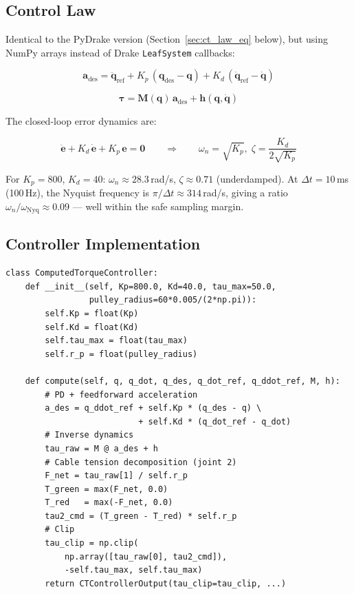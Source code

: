 \documentclass[11pt,a4paper]{article}
\newcommand{\bq}{\bm{q}}
\newcommand{\bdq}{\dot{\bm{q}}}
\newcommand{\bddq}{\ddot{\bm{q}}}
\newcommand{\btau}{\bm{\tau}}
\newcommand{\bM}{\bm{M}}
\newcommand{\bh}{\bm{h}}
\begin{document}
\subsection{Control Law}

Identical to the PyDrake version (Section~\ref{sec:ct_law_eq} below), but using NumPy arrays instead of Drake \texttt{LeafSystem} callbacks:

\begin{equation}
\boxed{
\bm{a}_{\mathrm{des}} = \bddq_{\mathrm{ref}} + K_p\,(\bq_{\mathrm{des}} - \bq) + K_d\,(\bdq_{\mathrm{ref}} - \bdq)
}
\label{sec:ct_law_eq}
\end{equation}

\begin{equation}
\boxed{
\btau = \bM(\bq)\,\bm{a}_{\mathrm{des}} + \bh(\bq, \bdq)
}
\label{eq:ct_isaac}
\end{equation}

The closed-loop error dynamics are:

\begin{equation}
    \ddot{\bm{e}} + K_d\,\dot{\bm{e}} + K_p\,\bm{e} = \bm{0}
    \qquad \Longrightarrow \qquad
    \omega_n = \sqrt{K_p},\; \zeta = \frac{K_d}{2\sqrt{K_p}}
\end{equation}

\begin{resultbox}
For $K_p = 800$, $K_d = 40$: $\omega_n \approx 28.3$\,rad/s, $\zeta \approx 0.71$ (underdamped). At $\Delta t = 10$\,ms (100\,Hz), the Nyquist frequency is $\pi/\Delta t \approx 314$\,rad/s, giving a ratio $\omega_n / \omega_{\mathrm{Nyq}} \approx 0.09$ --- well within the safe sampling margin.
\end{resultbox}

\subsection{Controller Implementation}

\begin{lstlisting}[caption={Engine-agnostic CT controller --- \texttt{controller/computed\_torque\_isaacsim.py}}]
class ComputedTorqueController:
    def __init__(self, Kp=800.0, Kd=40.0, tau_max=50.0,
                 pulley_radius=60*0.005/(2*np.pi)):
        self.Kp = float(Kp)
        self.Kd = float(Kd)
        self.tau_max = float(tau_max)
        self.r_p = float(pulley_radius)

    def compute(self, q, q_dot, q_des, q_dot_ref, q_ddot_ref, M, h):
        # PD + feedforward acceleration
        a_des = q_ddot_ref + self.Kp * (q_des - q) \
                           + self.Kd * (q_dot_ref - q_dot)
        # Inverse dynamics
        tau_raw = M @ a_des + h
        # Cable tension decomposition (joint 2)
        F_net = tau_raw[1] / self.r_p
        T_green = max(F_net, 0.0)
        T_red   = max(-F_net, 0.0)
        tau2_cmd = (T_green - T_red) * self.r_p
        # Clip
        tau_clip = np.clip(
            np.array([tau_raw[0], tau2_cmd]),
            -self.tau_max, self.tau_max)
        return CTControllerOutput(tau_clip=tau_clip, ...)
\end{lstlisting}
\end{document}
